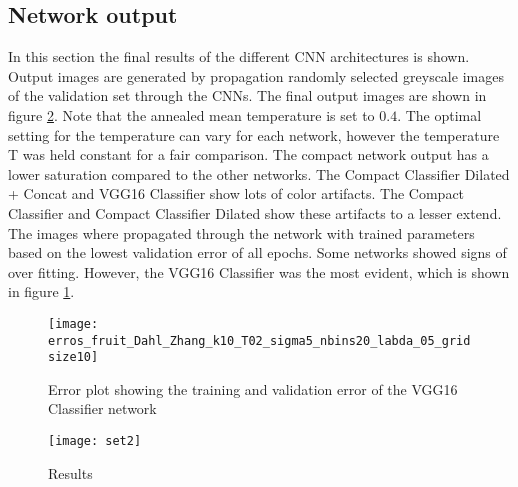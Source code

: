 \subsection{Network output}
In this section the final results of the different CNN architectures is shown. Output images are generated by propagation randomly selected greyscale images of the validation set through the CNNs. The final output images are shown in figure \ref{fig:results}. Note that the annealed mean temperature is set to $0.4$. The optimal setting for the temperature can vary for each network, however the temperature T was held constant for a fair comparison. The compact network output has a lower saturation compared to the other networks. The Compact Classifier Dilated + Concat and VGG16 Classifier show lots of color artifacts. The Compact Classifier and Compact Classifier Dilated show these artifacts to a lesser extend. The images where propagated through the network with trained parameters based on the lowest validation error of all epochs. Some networks showed signs of over fitting. However, the VGG16 Classifier was the most evident, which is shown in figure \ref{fig:overfit}.
\begin{figure}[h!]
	\centering
	\texttt{[image: erros\_fruit\_Dahl\_Zhang\_k10\_T02\_sigma5\_nbins20\_labda\_05\_gridsize10]}
	\caption{Error plot showing the training and validation error of the VGG16 Classifier network}
	\label{fig:overfit}
\end{figure}

\clearpage
\begin{figure}[h!]
	\centering
	\texttt{[image: set2]}
	\caption{Results}
	\label{fig:results}
\end{figure}



